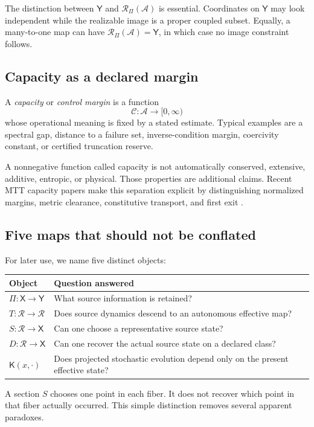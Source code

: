 \documentclass[11pt]{article}
\newcommand{\X}{\mathsf X}
\newcommand{\Y}{\mathsf Y}
\newcommand{\A}{\mathcal A}
\newcommand{\Rset}{\mathcal R}
\newcommand{\K}{\mathsf K}
\newcommand{\Ccap}{\mathcal C}
\begin{document}
The distinction between $\Y$ and $\Rset_\Pi(\A)$ is essential.  Coordinates
on $\Y$ may look independent while the realizable image is a proper coupled
subset.  Equally, a many-to-one map can have
$\Rset_\Pi(\A)=\Y$, in which case no image constraint follows.

\subsection{Capacity as a declared margin}

\begin{definition}
A \emph{capacity} or \emph{control margin} is a function
\[
  \Ccap:\A\longrightarrow[0,\infty)
\]
whose operational meaning is fixed by a stated estimate.  Typical examples
are a spectral gap, distance to a failure set, inverse-condition margin,
coercivity constant, or certified truncation reserve.
\end{definition}

A nonnegative function called capacity is not automatically conserved,
extensive, additive, entropic, or physical.  Those properties are additional
claims.  Recent MTT capacity papers make this separation explicit by
distinguishing normalized margins, metric clearance, constitutive transport,
and first exit \cite{nero_capacity_invariant,nero_capacity_budget,
nero_capacity_dynamics}.

\subsection{Five maps that should not be conflated}

For later use, we name five distinct objects:
\begin{center}
\begingroup
\renewcommand{\arraystretch}{1.18}
\begin{tabularx}{\textwidth}{>{\raggedright\arraybackslash\bfseries}p{}>{\raggedright\arraybackslash}X}
\toprule
Object & Question answered \\
\midrule
$\Pi:\X\to\Y$ & What source information is retained? \\
$T:\Rset\to\Rset$ & Does source dynamics descend to an autonomous effective map? \\
$S:\Rset\to\X$ & Can one choose a representative source state? \\
$D:\Rset\to\X$ & Can one recover the actual source state on a declared class? \\
$\K(x,\cdot)$ & Does projected stochastic evolution depend only on the present effective state? \\
\bottomrule
\end{tabularx}
\endgroup
\end{center}
A section $S$ chooses one point in each fiber.  It does not recover which
point in that fiber actually occurred.  This simple distinction removes
several apparent paradoxes.
\end{document}
